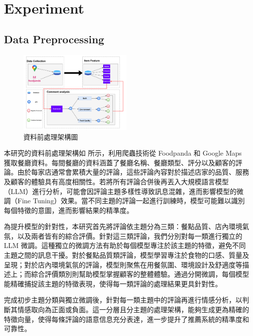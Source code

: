\section{Experiment}
    \subsection{Data Preprocessing}
        \begin{figure}[tbh]
            \centering
            \includegraphics[width=0.5\textwidth]{img/preprocess.pdf}
            \caption{資料前處理架構圖}
            \label{fig-preprocess}
        \end{figure}
        本研究的資料前處理架構如  所示，利用爬蟲技術從 Foodpanda 和 Google Maps 獲取餐廳資料。每間餐廳的資料涵蓋了餐廳名稱、餐廳類型、評分以及顧客的評論。由於每家店通常會累積大量的評論，這些評論內容對於描述店家的品質、服務及顧客的體驗具有高度相關性。若將所有評論合併後再丟入大規模語言模型（LLM）進行分析，可能會因評論主題多樣性導致訊息混雜，進而影響模型的微調（Fine Tuning）效果。當不同主題的評論一起進行訓練時，模型可能難以識別每個特徵的意圖，進而影響結果的精準度。

        為提升模型的針對性，本研究首先將評論依主題分為三類：餐點品質、店內環境氣氛，以及兩者皆有的綜合評價。針對這三類評論，我們分別對每一類進行獨立的 LLM 微調。這種獨立的微調方法有助於每個模型專注於該主題的特徵，避免不同主題之間的訊息干擾。對於餐點品質類評論，模型學習專注於食物的口感、質量及呈現；對於店內環境氣氛的評論，模型則聚焦在用餐氛圍、環境設計及舒適度等描述上；而綜合評價類別則幫助模型掌握顧客的整體體驗。通過分開微調，每個模型能精確捕捉該主題的特徵表現，使得每一類評論的處理結果更具針對性。

        完成初步主題分類與獨立微調後，針對每一類主題中的評論再進行情感分析，以判斷其情感取向為正面或負面。這一分層且分主題的處理架構，能夠生成更為精確的特徵向量，使得每條評論的語意信息充分表達，進一步提升了推薦系統的精準度和可靠性。
\color{black}